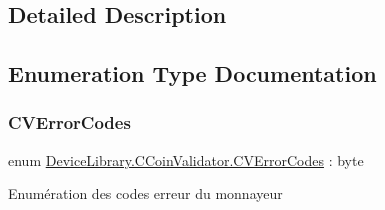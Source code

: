 \subsection{Detailed Description}


\subsection{Enumeration Type Documentation}
\mbox{\label{group___erreur_ga68c5b73cc3b337502d9f92154d933591}} 
\subsubsection{\texorpdfstring{C\+V\+Error\+Codes}{CVErrorCodes}}
{\footnotesize\ttfamily enum \mbox{\hyperlink{group___erreur_ga68c5b73cc3b337502d9f92154d933591}{Device\+Library.\+C\+Coin\+Validator.\+C\+V\+Error\+Codes}} \+: byte\hspace{0.3cm}{\ttfamily [strong]}}



Enumération des codes erreur du monnayeur 

